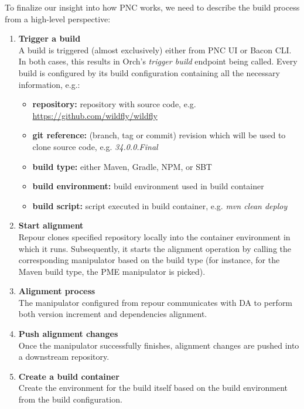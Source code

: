 \documentclass[../main.tex]{subfiles}
\begin{document}
To finalize our insight into how PNC works, we need to describe the build process from a high-level perspective:
\begin{enumerate}
    \item \textbf{Trigger a build}\\
    A build is triggered (almost exclusively) either from PNC UI or Bacon CLI. In both cases, this results in Orch's \textit{trigger build} endpoint being called. Every build is configured by its build configuration containing all the necessary information, e.g.:
    \begin{itemize}
        \item \textbf{repository:} repository with source code, e.g. \url{https://github.com/wildfly/wildfly}
        \item \textbf{git reference:} (branch, tag or commit) revision which will be used to clone source code, e.g. \textit{34.0.0.Final}
        \item \textbf{build type:} either Maven, Gradle, NPM, or SBT
        \item \textbf{build environment:} build environment used in build container
        \item \textbf{build script:} script executed in build container, e.g. \textit{mvn clean deploy}
    \end{itemize}

    \item \textbf{Start alignment}\\
    Repour clones specified repository locally into the container environment in which it runs. Subsequently, it starts the alignment operation by calling the corresponding manipulator based on the build type (for instance, for the Maven build type, the PME manipulator is picked).

    \item \textbf{Alignment process}\\
    The manipulator configured from repour communicates with DA to perform both version increment and dependencies alignment.

    \item \textbf{Push alignment changes}\\
    Once the manipulator successfully finishes, alignment changes are pushed into a downstream repository.

    \item \textbf{Create a build container}\\
    Create the environment for the build itself based on the build environment from the build configuration.


\end{enumerate}
\end{document}
